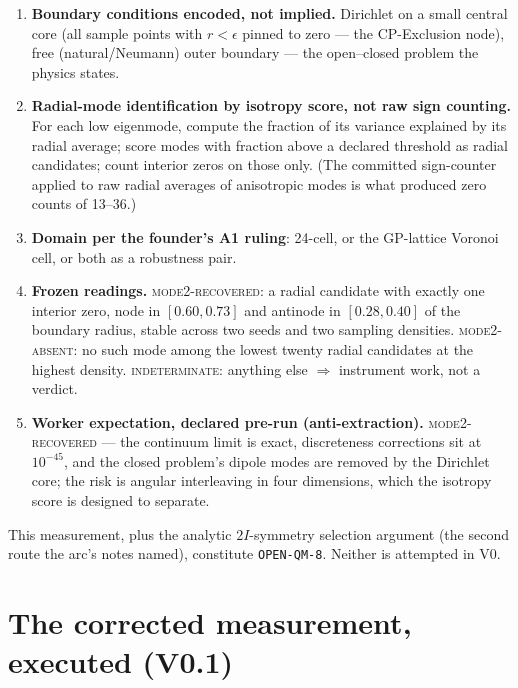 \documentclass[12pt]{article}
\begin{document}
\begin{enumerate}[leftmargin=2em]
\item \textbf{Boundary conditions encoded, not implied.}  Dirichlet on
a small central core (all sample points with $r < \epsilon$ pinned to
zero --- the CP-Exclusion node), free (natural/Neumann) outer boundary
--- the open--closed problem the physics states.
\item \textbf{Radial-mode identification by isotropy score, not raw
sign counting.}  For each low eigenmode, compute the fraction of its
variance explained by its radial average; score modes with fraction
above a declared threshold as radial candidates; count interior zeros
on those only.  (The committed sign-counter applied to raw radial
averages of anisotropic modes is what produced zero counts of 13--36.)
\item \textbf{Domain per the founder's A1 ruling}: 24-cell, or the
GP-lattice Voronoi cell, or both as a robustness pair.
\item \textbf{Frozen readings.}  \textsc{mode2-recovered}: a radial
candidate with exactly one interior zero, node in $[0.60, 0.73]$ and
antinode in $[0.28, 0.40]$ of the boundary radius, stable across two
seeds and two sampling densities.  \textsc{mode2-absent}: no such mode
among the lowest twenty radial candidates at the highest density.
\textsc{indeterminate}: anything else $\Rightarrow$ instrument work,
not a verdict.
\item \textbf{Worker expectation, declared pre-run
(anti-extraction).}  \textsc{mode2-recovered} --- the continuum limit
is exact, discreteness corrections sit at $10^{-45}$, and the closed
problem's dipole modes are removed by the Dirichlet core; the risk is
angular interleaving in four dimensions, which the isotropy score is
designed to separate.
\end{enumerate}

This measurement, plus the analytic $2I$-symmetry selection argument
(the second route the arc's notes named), constitute
\texttt{OPEN-QM-8}.  Neither is attempted in V0.

\section{The corrected measurement, executed (V0.1)}
\label{sec:measurement}
\end{document}

